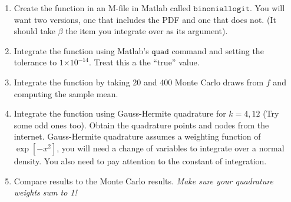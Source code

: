 \documentclass{article}
\providecommand{\e}[1]{\ensuremath{\times 10^{#1}}}
\begin{document}
\begin{enumerate}
\item Create the function in an M-file in Matlab called $\mathtt{binomiallogit}$. You will want two versions, one that includes the PDF and one that does not. (It should take $\beta$ the item you integrate over as its argument).
\begin{comment}
\begin{verbatim}
function f=binomiallogit(beta)
     X=0.5; mu = 0.5; sigma =2;
     beta = beta*sigma*sqrt(2)+mu;
     f=exp(beta*X)./(1+exp(beta*X));
end


function f=binomiallogit(beta)
     X=0.5; mu = 0.5; sigma =2;
     f=exp(beta*X)./(1+exp(beta*X)) .* normpdf(beta,mu,sigma);
end
\end{verbatim}
\end{comment}

\item Integrate the function using Matlab's $\mathtt{quad}$ command and setting the tolerance to $1\e{-14}$.  Treat this a the ``true'' value.
\begin{comment}
\begin{verbatim}
[Ftrue,nevals]=quad(@binomiallogit,-10,10,1e-14);
z=randn(100,1);
Fmc=sum(binomiallogitnopdf(z))./length(z);
Fgh=binomiallogitnopdf(x)'*(w./sum(w));
\end{verbatim}
\end{comment}

\item Integrate the function by taking 20 and 400 Monte Carlo draws from $f$ and computing the sample mean.
\item Integrate the function using Gauss-Hermite quadrature for $k=4, 12$ (Try some odd ones too). Obtain the quadrature points and nodes from the internet. Gauss-Hermite quadrature assumes a weighting function of $\exp[-x^2]$, you will need a change of variables to integrate over a normal density. You also need to pay attention to the constant of integration.
\item Compare results to the Monte Carlo results. \textit{Make sure your quadrature weights sum to 1!}
\begin{comment}
\begin{table}[htdp]
\caption{True value: 0.5515}
\begin{center}
\begin{tabular}{l r r r }
Method & Points & Error\\
quad & 2597 & 1e-14 \\
monte carlo & 100 & 0.0166\\
Gauss Hermite & 4 & 0.0044234\\
Gauss Hermite & 12 & 0.0044469\\
\end{tabular}
\end{center}
\end{table}
\end{comment}


\end{enumerate}
\end{document}
